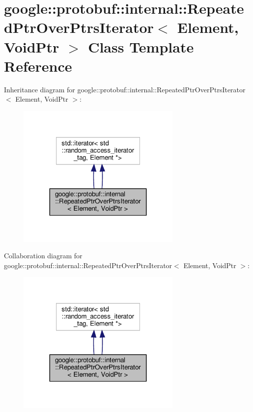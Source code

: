 \hypertarget{classgoogle_1_1protobuf_1_1internal_1_1RepeatedPtrOverPtrsIterator}{}\section{google\+:\+:protobuf\+:\+:internal\+:\+:Repeated\+Ptr\+Over\+Ptrs\+Iterator$<$ Element, Void\+Ptr $>$ Class Template Reference}
\label{classgoogle_1_1protobuf_1_1internal_1_1RepeatedPtrOverPtrsIterator}


Inheritance diagram for google\+:\+:protobuf\+:\+:internal\+:\+:Repeated\+Ptr\+Over\+Ptrs\+Iterator$<$ Element, Void\+Ptr $>$\+:
\nopagebreak
\begin{figure}[H]
\begin{center}
\leavevmode
\includegraphics[width=227pt]{classgoogle_1_1protobuf_1_1internal_1_1RepeatedPtrOverPtrsIterator__inherit__graph}
\end{center}
\end{figure}


Collaboration diagram for google\+:\+:protobuf\+:\+:internal\+:\+:Repeated\+Ptr\+Over\+Ptrs\+Iterator$<$ Element, Void\+Ptr $>$\+:
\nopagebreak
\begin{figure}[H]
\begin{center}
\leavevmode
\includegraphics[width=227pt]{classgoogle_1_1protobuf_1_1internal_1_1RepeatedPtrOverPtrsIterator__coll__graph}
\end{center}
\end{figure}

